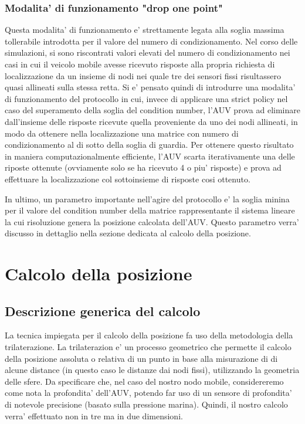 \subsubsection{Modalita' di funzionamento "drop one point"}
\par
Questa modalita' di funzionamento e' strettamente legata alla soglia massima tollerabile introdotta per il valore del numero di condizionamento. Nel corso delle simulazioni, si sono riscontrati valori elevati del numero di condizionamento nei casi in cui il veicolo mobile avesse ricevuto risposte alla propria richiesta di localizzazione da un insieme di nodi nei quale tre dei sensori fissi risultassero quasi allineati sulla stessa retta. Si e' pensato quindi di introdurre una modalita' di funzionamento del protocollo in cui, invece di applicare una strict policy nel caso del superamento della soglia del condition number, l'AUV prova ad eliminare dall'insieme delle risposte ricevute quella proveniente da uno dei nodi allineati, in modo da ottenere nella localizzazione una matrice con numero di condizionamento al di sotto della soglia di guardia. Per ottenere questo risultato in maniera computazionalmente efficiente, l'AUV scarta iterativamente una delle riposte ottenute (ovviamente solo se ha ricevuto 4 o piu' risposte) e prova ad effettuare la localizzazione col sottoinsieme di risposte cosi ottenuto.
\par
In ultimo, un parametro importante nell'agire del protocollo e' la soglia minina per il valore del condition number della matrice rappresentante il sistema lineare la cui risoluzione genera la posizione calcolata dell'AUV. Questo parametro verra' discusso in dettaglio nella sezione dedicata al calcolo della posizione.\newline


\section{Calcolo della posizione}

\subsection{Descrizione generica del calcolo}
La tecnica impiegata per il calcolo della posizione fa uso della metodologia della trilaterazione. La trilaterazion e' un processo geometrico che permette il calcolo della posizione assoluta o relativa di un punto in base alla misurazione di di alcune distance (in questo caso le distanze dai nodi fissi), utilizzando la geometria delle sfere.\newline
Da specificare che, nel caso del nostro nodo mobile, considereremo come nota la profondita' dell'AUV, potendo far uso di un sensore di profondita' di notevole precisione (basato sulla pressione marina).\newline
Quindi, il nostro calcolo verra' effettuato non in tre ma in due dimensioni. 

